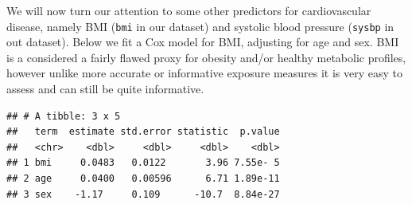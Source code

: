 \documentclass[
]{book}
\newenvironment{Shaded}{\begin{snugshade}}{\end{snugshade}}
\newcommand{\DataTypeTok}[1]{\textcolor[rgb]{0.13,0.29,0.53}{#1}}
\newcommand{\FloatTok}[1]{\textcolor[rgb]{0.00,0.00,0.81}{#1}}
\newcommand{\KeywordTok}[1]{\textcolor[rgb]{0.13,0.29,0.53}{\textbf{#1}}}
\newcommand{\NormalTok}[1]{#1}
\newcommand{\OperatorTok}[1]{\textcolor[rgb]{0.81,0.36,0.00}{\textbf{#1}}}
\newcommand{\StringTok}[1]{\textcolor[rgb]{0.31,0.60,0.02}{#1}}
\begin{document}
We will now turn our attention to some other predictors for cardiovascular disease, namely BMI (\texttt{bmi} in our dataset) and systolic blood pressure (\texttt{sysbp} in out dataset). Below we fit a Cox model for BMI, adjusting for age and sex. BMI is a considered a fairly flawed proxy for obesity and/or healthy metabolic profiles, however unlike more accurate or informative exposure measures it is very easy to assess and can still be quite informative.

\begin{Shaded}
\end{Shaded}

\begin{verbatim}
## # A tibble: 3 x 5
##   term  estimate std.error statistic  p.value
##   <chr>    <dbl>     <dbl>     <dbl>    <dbl>
## 1 bmi     0.0483   0.0122       3.96 7.55e- 5
## 2 age     0.0400   0.00596      6.71 1.89e-11
## 3 sex    -1.17     0.109      -10.7  8.84e-27
\end{verbatim}

\begin{Shaded}
\end{Shaded}
\end{document}
